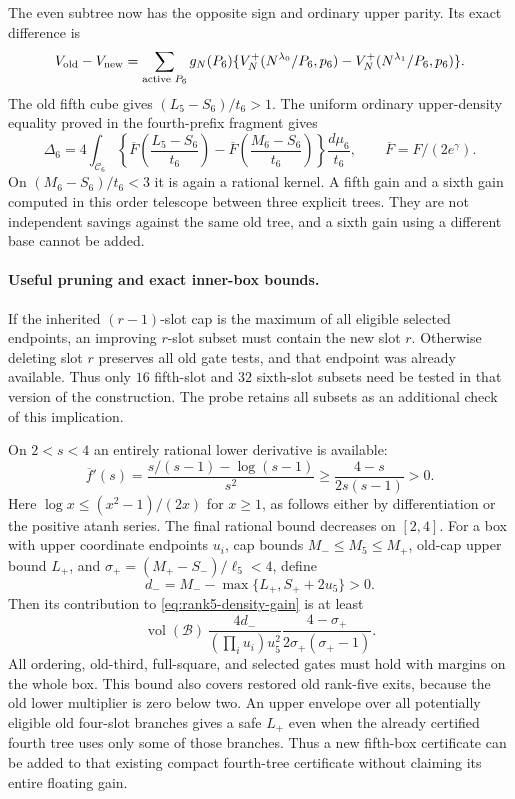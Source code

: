 \documentclass[11pt]{article}
\begin{document}
The even subtree now has the opposite sign and ordinary upper
parity. Its exact difference is
\begin{equation}\label{eq:rank6-exact-density}
 V_{\rm old}-V_{\rm new}
 =\sum_{\text{active }P_6}g_N(P_6)
 \{V_N^+(N^{\lambda_0}/P_6,p_6)
             -V_N^+(N^{\lambda_1}/P_6,p_6)\}.
\end{equation}
The old fifth cube gives $(L_5-S_6)/t_6>1$. The uniform ordinary
upper-density equality proved in the fourth-prefix fragment gives
\begin{equation}\label{eq:rank6-density-gain}
 \Delta_6=4\int_{\mathcal C_6}
 \left\{\overline F\left(\frac{L_5-S_6}{t_6}\right)
       -\overline F\left(\frac{M_6-S_6}{t_6}\right)\right\}
       \frac{d\mu_6}{t_6},\qquad \overline F=F/(2e^\gamma).
\end{equation}
On $(M_6-S_6)/t_6<3$ it is again a rational kernel. A fifth gain
and a sixth gain computed in this order telescope between three
explicit trees. They are not independent savings against the same
old tree, and a sixth gain using a different base cannot be added.

\paragraph{Useful pruning and exact inner-box bounds.}
If the inherited $(r-1)$-slot cap is the maximum of all eligible
selected endpoints, an improving $r$-slot subset must contain the
new slot $r$. Otherwise deleting slot $r$ preserves all old gate
tests, and that endpoint was already available. Thus only $16$
fifth-slot and $32$ sixth-slot subsets need be tested in that
version of the construction. The probe retains all subsets as
an additional check of this implication.

On $2<s<4$ an entirely rational lower derivative is available:
\[
 \overline f'(s)
 =\frac{s/(s-1)-\log(s-1)}{s^2}
 \ge\frac{4-s}{2s(s-1)}>0.
\]
Here $\log x\le(x^2-1)/(2x)$ for $x\ge1$, as follows either by
differentiation or the positive atanh series. The final rational
bound decreases on $[2,4]$.
For a box with upper coordinate endpoints $u_i$, cap bounds
$M_-\le M_5\le M_+$, old-cap upper bound $L_+$, and
$\sigma_+=(M_+-S_-)/\ell_5<4$, define
\[
 d_-=M_--\max\{L_+,S_++2u_5\}>0.
\]
Then its contribution to \eqref{eq:rank5-density-gain} is at least
\begin{equation}\label{eq:rank5-rational-box}
 \operatorname{vol}(\mathcal B)\,
 \frac{4d_-}{(\prod_i u_i)u_5^2}
 \frac{4-\sigma_+}{2\sigma_+(\sigma_+-1)}.
\end{equation}
All ordering, old-third, full-square, and selected gates must hold
with margins on the whole box. This bound also covers restored
old rank-five exits, because the old lower multiplier is zero
below two. An upper envelope over all potentially eligible old
four-slot branches gives a safe $L_+$ even when the already
certified fourth tree uses only some of those branches. Thus a
new fifth-box certificate can be added to that existing compact
fourth-tree certificate without claiming its entire floating gain.
\end{document}

